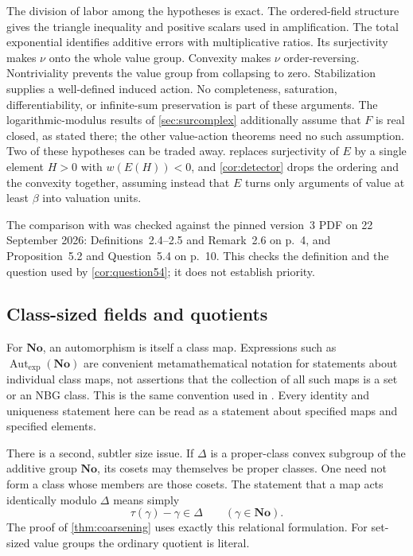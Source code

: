 \documentclass[11pt]{article}
\theoremstyle{definition}
\theoremstyle{remark}
\newcommand{\No}{\mathbf{No}}
\newcommand{\Gexp}{\operatorname{Aut}_{\exp}}
\numberwithin{equation}{section}
\begin{document}
The division of labor among the hypotheses is exact.
The ordered-field structure gives the triangle inequality and positive
scalars used in amplification. The total exponential identifies additive
errors with multiplicative ratios. Its surjectivity makes $\nu$ onto the
whole value group. Convexity makes $\nu$ order-reversing. Nontriviality
prevents the value group from collapsing to zero. Stabilization supplies a
well-defined induced action. No completeness, saturation, differentiability,
or infinite-sum preservation is part of these arguments. The logarithmic-modulus
results of \cref{sec:surcomplex} additionally assume that $F$ is real closed,
as stated there; the other value-action theorems need no such assumption.
Two of these hypotheses can be traded away.  replaces
surjectivity of $E$ by a single element $H>0$ with $w(E(H))<0$, and
\cref{cor:detector} drops the ordering and the convexity together, assuming
instead that $E$ turns only arguments of value at least $\beta$ into
valuation units.

The comparison with \cite{KKS} was checked against the pinned version~3 PDF
on 22 September 2026: Definitions~2.4--2.5 and Remark~2.6 on p.~4, and
Proposition~5.2 and Question~5.4 on p.~10. This checks the definition and
the question used by \cref{cor:question54}; it does not establish priority.

\subsection{Class-sized fields and quotients}

For $\No$, an automorphism is itself a class map. Expressions such as
$\Gexp(\No)$ are convenient metamathematical notation for statements about
individual class maps, not assertions that the collection of all such maps
is a set or an NBG class. This is the same convention used in
\cite[Remark~2.1]{KKS}. Every identity and uniqueness statement here can be
read as a statement about specified maps and specified elements.

There is a second, subtler size issue. If $\Delta$ is a proper-class convex
subgroup of the additive group $\No$, its cosets may themselves be proper
classes. One need not form a class whose members are those cosets.
The statement that a map acts identically modulo $\Delta$ means simply
\begin{equation}\label{eq:relational-quotient}
 \tau(\gamma)-\gamma\in\Delta\qquad(\gamma\in\No).
\end{equation}
The proof of \cref{thm:coarsening} uses exactly this relational formulation.
For set-sized value groups the ordinary quotient is literal.
\end{document}
